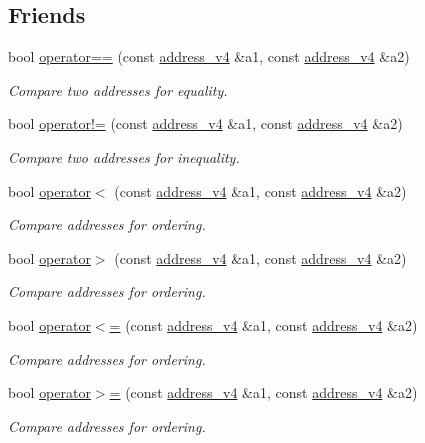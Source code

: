 \subsection*{Friends}
\begin{DoxyCompactItemize}
\item 
bool \hyperlink{classasio_1_1ip_1_1address__v4_a712c2ca30042c6d416f7ce4eb8d463ff}{operator==} (const \hyperlink{classasio_1_1ip_1_1address__v4}{address\+\_\+v4} \&a1, const \hyperlink{classasio_1_1ip_1_1address__v4}{address\+\_\+v4} \&a2)
\begin{DoxyCompactList}\small\item\em Compare two addresses for equality. \end{DoxyCompactList}\item 
bool \hyperlink{classasio_1_1ip_1_1address__v4_ab6af0c8b3ce02a4a11dc609232655f44}{operator!=} (const \hyperlink{classasio_1_1ip_1_1address__v4}{address\+\_\+v4} \&a1, const \hyperlink{classasio_1_1ip_1_1address__v4}{address\+\_\+v4} \&a2)
\begin{DoxyCompactList}\small\item\em Compare two addresses for inequality. \end{DoxyCompactList}\item 
bool \hyperlink{classasio_1_1ip_1_1address__v4_aa987a95c5e7cc6cf5bb709938c0075ce}{operator$<$} (const \hyperlink{classasio_1_1ip_1_1address__v4}{address\+\_\+v4} \&a1, const \hyperlink{classasio_1_1ip_1_1address__v4}{address\+\_\+v4} \&a2)
\begin{DoxyCompactList}\small\item\em Compare addresses for ordering. \end{DoxyCompactList}\item 
bool \hyperlink{classasio_1_1ip_1_1address__v4_a8ee052e57f8ad8e8add79dac9bccddb2}{operator$>$} (const \hyperlink{classasio_1_1ip_1_1address__v4}{address\+\_\+v4} \&a1, const \hyperlink{classasio_1_1ip_1_1address__v4}{address\+\_\+v4} \&a2)
\begin{DoxyCompactList}\small\item\em Compare addresses for ordering. \end{DoxyCompactList}\item 
bool \hyperlink{classasio_1_1ip_1_1address__v4_a58d3a9d784188342f5938a8a3dc9962d}{operator$<$=} (const \hyperlink{classasio_1_1ip_1_1address__v4}{address\+\_\+v4} \&a1, const \hyperlink{classasio_1_1ip_1_1address__v4}{address\+\_\+v4} \&a2)
\begin{DoxyCompactList}\small\item\em Compare addresses for ordering. \end{DoxyCompactList}\item 
bool \hyperlink{classasio_1_1ip_1_1address__v4_a1ae27ed4b98e7b2eb05a79044fe41a33}{operator$>$=} (const \hyperlink{classasio_1_1ip_1_1address__v4}{address\+\_\+v4} \&a1, const \hyperlink{classasio_1_1ip_1_1address__v4}{address\+\_\+v4} \&a2)
\begin{DoxyCompactList}\small\item\em Compare addresses for ordering. \end{DoxyCompactList}\end{DoxyCompactItemize}
